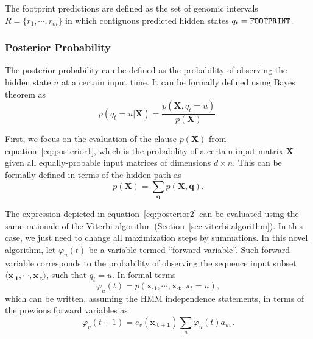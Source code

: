 The footprint predictions are defined as the set of genomic intervals $R = \{ {r}_{1}, \cdots, {r}_{m} \}$ in which contiguous predicted hidden states $ q_t = \text{{\tt FOOTPRINT}} $.

\subsubsection{Posterior Probability}
\label{sec:posterior.probability}

The posterior probability can be defined as the probability of observing the hidden state $ u $ at a certain input time. It can be formally defined using Bayes theorem as
\begin{equation}
  \label{eq:posterior1}
  p(q_t = u | \mathbf{X}) = \frac{p(\mathbf{X}, q_t = u)}{p(\mathbf{X})}.
\end{equation}

First, we focus on the evaluation of the clause $ p(\mathbf{X}) $ from equation~\ref{eq:posterior1}, which is the probability of a certain input matrix $ \mathbf{X} $ given all equally-probable input matrices of dimensions $ d \times n $. This can be formally defined in terms of the hidden path as
\begin{equation}
  \label{eq:posterior2}
  p(\mathbf{X}) = \sum_{\mathbf{q}} p(\mathbf{X},\mathbf{q}).
\end{equation}

The expression depicted in equation~\ref{eq:posterior2} can be evaluated using the same rationale of the Viterbi algorithm (Section~\ref{sec:viterbi.algorithm}). In this case, we just need to change all maximization steps by summations. In this novel algorithm, let $ \varphi_u(t) $ be a variable termed ``forward variable''. Such forward variable corresponds to the probability of observing the sequence input subset $ \langle \mathbf{{x}_{\cdot 1}}, \cdots, \mathbf{{x}_{\cdot t}} \rangle $, such that $ q_t = u $. In formal terms
\begin{equation}
  \label{eq:posterior3}
  \varphi_u(t) = p(\mathbf{{x}_{\cdot 1}}, \cdots, \mathbf{{x}_{\cdot t}}, \pi_t = u),
\end{equation}
which can be written, assuming the HMM independence statements, in terms of the previous forward variables as
\begin{equation}
  \label{eq:posterior4}
  \varphi_v(t+1) = e_v(\mathbf{{x}_{\cdot t+1}}) \sum_{u}{\varphi_u(t) a_{uv}}.
\end{equation}

